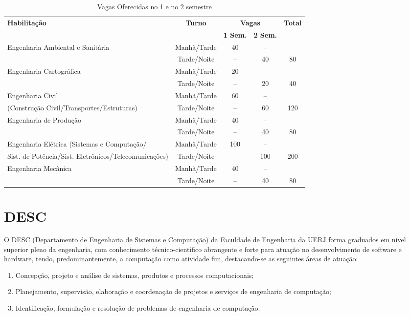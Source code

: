 \setlength{\tabcolsep}{5pt}
\begin{table}
\centering
\caption{Vagas Oferecidas no 1\textordmasculine{} e no 2\textordmasculine{} semestre}
\label{tabvagas}
\renewcommand{\arraystretch}{1.5}
  \begin{tabularx}{\textwidth}{|X|c|c|c|c|}
	\hline
	\multirow{2}{*}{\textbf{Habilitação}}& \multirow{2}{*}{\textbf{Turno}} & \multicolumn{2}{c|}{\textbf{Vagas}} & \multirow{2}{*}{\textbf{Total}}\\
	\cline{3-4}& & \textbf{1\textordmasculine{} Sem.}                     & \textbf{2\textordmasculine{} Sem.}                &     \\
		\hline
		Engenharia Ambiental e Sanitária & Manhã/Tarde & 40 & --&     \\
		                                 & Tarde/Noite & -- & 40 & 80 \\
		\hline
		Engenharia Cartográfica          & Manhã/Tarde & 20 & -- &    \\
		                                 & Tarde/Noite & -- & 20 & 40 \\
		\hline
		Engenharia Civil                 & Manhã/Tarde & 60 & -- &    \\
		(Construção Civil/Transportes/Estruturas) & Tarde/Noite & -- & 60 & 120 \\
		\hline
		Engenharia de Produção           & Manhã/Tarde & 40 & --&     \\
		                                 & Tarde/Noite & -- & 40 & 80  \\
		\hline
		Engenharia Elétrica (Sistemas e Computação/ & Manhã/Tarde& 100 & --  &     \\
		Sist. de Potência/Sist. Eletrônicos/Telecomunicações) & Tarde/Noite & -- & 100  & 200 \\
		\hline
		Engenharia Mecânica              & Manhã/Tarde & 40 & -- &     \\
		                                 & Tarde/Noite & -- & 40 & 80  \\
		\hline
	\end{tabularx}
\end{table}

\chapter{DESC}

O DESC (Departamento de Engenharia de Sistemas e Computação) da Faculdade de Engenharia da UERJ forma graduados em nível superior pleno da engenharia, com conhecimento técnico-científico abrangente e forte para atuação no desenvolvimento de software e hardware, tendo, predominantemente, a computação como atividade fim, destacando-se as seguintes áreas de atuação:
\begin{enumerate}
	\item Concepção, projeto e análise de sistemas, produtos e processos computacionais;
	\item Planejamento, supervisão, elaboração e coordenação de projetos e serviços de engenharia de computação;
	\item Identificação, formulação e resolução de problemas de engenharia de computação.
\end{enumerate}

